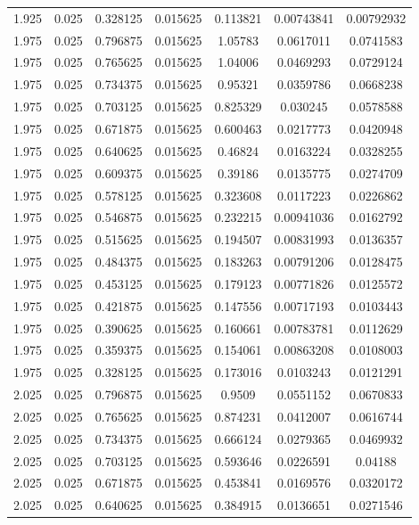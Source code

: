\begin{flushleft}
\begin{longtable}{ccccccc}
1.925 & 0.025 & 0.328125 & 0.015625 & 0.113821 & 0.00743841 & 0.00792932  \\ 
1.975 & 0.025 & 0.796875 & 0.015625 & 1.05783 & 0.0617011 & 0.0741583  \\ 
1.975 & 0.025 & 0.765625 & 0.015625 & 1.04006 & 0.0469293 & 0.0729124  \\ 
1.975 & 0.025 & 0.734375 & 0.015625 & 0.95321 & 0.0359786 & 0.0668238  \\ 
1.975 & 0.025 & 0.703125 & 0.015625 & 0.825329 & 0.030245 & 0.0578588  \\ 
1.975 & 0.025 & 0.671875 & 0.015625 & 0.600463 & 0.0217773 & 0.0420948  \\ 
1.975 & 0.025 & 0.640625 & 0.015625 & 0.46824 & 0.0163224 & 0.0328255  \\ 
1.975 & 0.025 & 0.609375 & 0.015625 & 0.39186 & 0.0135775 & 0.0274709  \\ 
1.975 & 0.025 & 0.578125 & 0.015625 & 0.323608 & 0.0117223 & 0.0226862  \\ 
1.975 & 0.025 & 0.546875 & 0.015625 & 0.232215 & 0.00941036 & 0.0162792  \\ 
1.975 & 0.025 & 0.515625 & 0.015625 & 0.194507 & 0.00831993 & 0.0136357  \\ 
1.975 & 0.025 & 0.484375 & 0.015625 & 0.183263 & 0.00791206 & 0.0128475  \\ 
1.975 & 0.025 & 0.453125 & 0.015625 & 0.179123 & 0.00771826 & 0.0125572  \\ 
1.975 & 0.025 & 0.421875 & 0.015625 & 0.147556 & 0.00717193 & 0.0103443  \\ 
1.975 & 0.025 & 0.390625 & 0.015625 & 0.160661 & 0.00783781 & 0.0112629  \\ 
1.975 & 0.025 & 0.359375 & 0.015625 & 0.154061 & 0.00863208 & 0.0108003  \\ 
1.975 & 0.025 & 0.328125 & 0.015625 & 0.173016 & 0.0103243 & 0.0121291  \\ 
2.025 & 0.025 & 0.796875 & 0.015625 & 0.9509 & 0.0551152 & 0.0670833  \\ 
2.025 & 0.025 & 0.765625 & 0.015625 & 0.874231 & 0.0412007 & 0.0616744  \\ 
2.025 & 0.025 & 0.734375 & 0.015625 & 0.666124 & 0.0279365 & 0.0469932  \\ 
2.025 & 0.025 & 0.703125 & 0.015625 & 0.593646 & 0.0226591 & 0.04188  \\ 
2.025 & 0.025 & 0.671875 & 0.015625 & 0.453841 & 0.0169576 & 0.0320172  \\ 
2.025 & 0.025 & 0.640625 & 0.015625 & 0.384915 & 0.0136651 & 0.0271546  \\ 

\end{longtable}
\end{flushleft}
